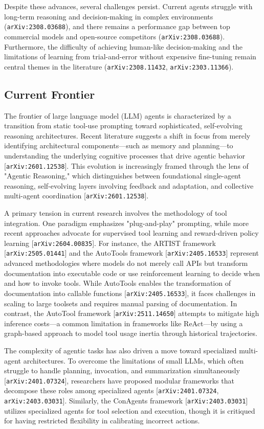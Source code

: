 \documentclass[11pt]{article}
\begin{document}
Despite these advances, several challenges persist. Current agents struggle with long-term reasoning and decision-making in complex environments (\texttt{arXiv:2308.03688}), and there remains a performance gap between top commercial models and open-source competitors (\texttt{arXiv:2308.03688}). Furthermore, the difficulty of achieving human-like decision-making and the limitations of learning from trial-and-error without expensive fine-tuning remain central themes in the literature (\texttt{arXiv:2308.11432}, \texttt{arXiv:2303.11366}).

\subsection{Current Frontier}

The frontier of large language model (LLM) agents is characterized by a transition from static tool-use prompting toward sophisticated, self-evolving reasoning architectures. Recent literature suggests a shift in focus from merely identifying architectural components—such as memory and planning—to understanding the underlying cognitive processes that drive agentic behavior [\texttt{arXiv:2601.12538}]. This evolution is increasingly framed through the lens of "Agentic Reasoning," which distinguishes between foundational single-agent reasoning, self-evolving layers involving feedback and adaptation, and collective multi-agent coordination [\texttt{arXiv:2601.12538}].

A primary tension in current research involves the methodology of tool integration. One paradigm emphasizes "plug-and-play" prompting, while more recent approaches advocate for supervised tool learning and reward-driven policy learning [\texttt{arXiv:2604.00835}]. For instance, the ARTIST framework [\texttt{arXiv:2505.01441}] and the AutoTools framework [\texttt{arXiv:2405.16533}] represent advanced methodologies where models do not merely call APIs but transform documentation into executable code or use reinforcement learning to decide when and how to invoke tools. While AutoTools enables the transformation of documentation into callable functions [\texttt{arXiv:2405.16533}], it faces challenges in scaling to large toolsets and requires manual parsing of documentation. In contrast, the AutoTool framework [\texttt{arXiv:2511.14650}] attempts to mitigate high inference costs—a common limitation in frameworks like ReAct—by using a graph-based approach to model tool usage inertia through historical trajectories.

The complexity of agentic tasks has also driven a move toward specialized multi-agent architectures. To overcome the limitations of small LLMs, which often struggle to handle planning, invocation, and summarization simultaneously [\texttt{arXiv:2401.07324}], researchers have proposed modular frameworks that decompose these roles among specialized agents [\texttt{arXiv:2401.07324}, \texttt{arXiv:2403.03031}]. Similarly, the ConAgents framework [\texttt{arXiv:2403.03031}] utilizes specialized agents for tool selection and execution, though it is critiqued for having restricted flexibility in calibrating incorrect actions.
\end{document}
